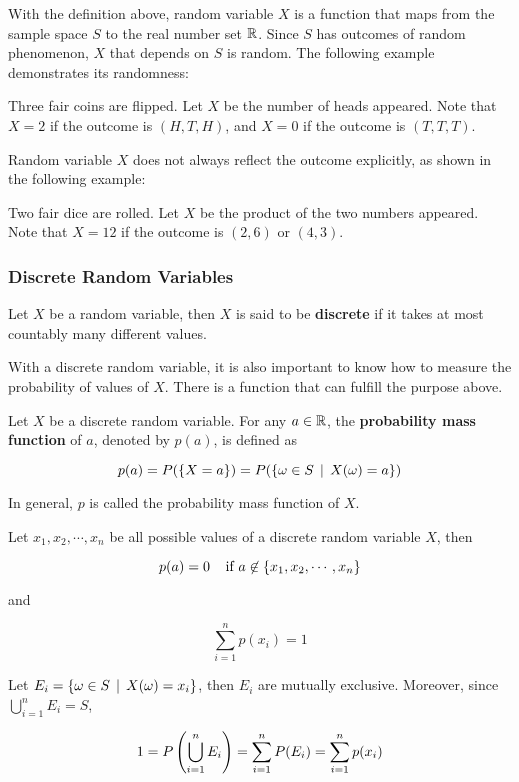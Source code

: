 \documentclass[a4paper,12pt]{article}
\begin{document}
With the definition above, random variable $X$ is a function that maps from the sample space $S$ to the real number set $\mathbb{R}$. Since $S$ has outcomes of random phenomenon, $X$ that depends on $S$ is random. The following example demonstrates its randomness:\n

\begin{exm}
  Three fair coins are flipped. Let $X$ be the number of heads appeared. Note that $X=2$ if the outcome is $(H,T,H)$, and $X=0$ if the outcome is $(T,T,T)$.
\end{exm}\n

Random variable $X$ does not always reflect the outcome explicitly, as shown in the following example:\n

\begin{exm}
  Two fair dice are rolled. Let $X$ be the product of the two numbers appeared. Note that $X=12$ if the outcome is $(2,6)$ or $(4,3)$.
\end{exm}

\subsubsection{Discrete Random Variables}
\begin{dft}
  Let $X$ be a random variable, then $X$ is said to be \textbf{discrete} if it takes at most countably many different values.
\end{dft}\n

With a discrete random variable, it is also important to know how to measure the probability of values of $X$. There is a function that can fulfill the purpose above.\n

\begin{dft}
  Let $X$ be a discrete random variable. For any $a\in\mathbb{R}$, the \textbf{probability mass function} of $a$, denoted by $p(a)$, is defined as

  $$p(a)=P(\left\{ X=a\right\})=P(\left\{ \omega\in S\,\mid\, X(\omega)=a\right\})$$
\end{dft}\n

In general, $p$ is called the probability mass function of $X$.\n

\begin{pst}
  Let $x_{1},x_{2},\cdots,x_{n}$ be all possible values of a discrete random variable $X$, then
  
  $$p(a)=0\;\;\;\;\text{if }a\not\in\left\{ x_{1},x_{2},\cdots,x_{n}\right\}$$\s

  and

  $$\sum_{i=1}^{n}p(x_{i})=1$$\s

  \prf Let $E_{i}=\left\{ \omega\in S\,\mid\, X(\omega)=x_{i}\right\}$, then $E_{i}$ are mutually exclusive. Moreover, since $\bigcup_{i=1}^{n}E_{i}=S$,

  $$1=P\left( \bigcup_{i=1}^{n}E_{i}\right)=\sum_{i=1}^{n}P(E_{i})=\sum_{i=1}^{n}p(x_{i})$$
\end{pst}
\end{document}
